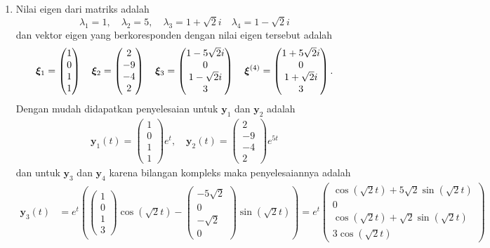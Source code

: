 \documentclass[a4paper]{article}
\theoremstyle{definisi}
\newcommand{\bfxi}{\boldsymbol{\xi}}
\numberwithin{equation}{section}
\begin{document}
\begin{enumerate}
    \item Nilai eigen dari matriks adalah
    \[\lambda_1 = 1, \quad \lambda_2 = 5, \quad \lambda_3 = 1 + \sqrt{2}i \quad \lambda_4 = 1 - \sqrt{2}i\]
    dan vektor eigen yang berkoresponden dengan nilai eigen tersebut adalah
    \[\bfxi_1 = \begin{pmatrix}1\\0\\1\\1\end{pmatrix} \quad \bfxi_2 = \begin{pmatrix}2\\-9\\-4\\2\end{pmatrix} \quad \bfxi_3 = \begin{pmatrix}1-5\sqrt{2}i\\0\\\-1-\sqrt{2}i\\3\end{pmatrix} \quad \bfxi^{(4)} = \begin{pmatrix}1+5\sqrt{2}i\\0\\\-1+\sqrt{2}i\\3\end{pmatrix}.\]
    Dengan mudah didapatkan penyelesaian untuk $\mathbf{y}_1$ dan $\mathbf{y}_2$ adalah
    \begin{align*}
      \mathbf{y}_1(t) = \begin{pmatrix}1\\0\\1\\1\end{pmatrix}e^t,\quad
      \mathbf{y}_2(t) = \begin{pmatrix}2\\-9\\-4\\2\end{pmatrix}e^{5t}
    \end{align*}
    dan untuk $\mathbf{y}_3$ dan $\mathbf{y}_4$ karena bilangan kompleks maka penyelesaiannya adalah
    \begin{align*}
      \mathbf{y}_3(t) &= e^t\left(\begin{pmatrix}1\\0\\1\\3\end{pmatrix}\cos(\sqrt{2}t) - \begin{pmatrix}-5\sqrt{2}\\0\\-\sqrt{2}\\0\end{pmatrix}\sin(\sqrt{2}t)\right)= e^t\begin{pmatrix}\cos(\sqrt{2}t)+5\sqrt{2}\sin(\sqrt{2}t)\\0\\\cos(\sqrt{2}t)+\sqrt{2}\sin(\sqrt{2}t)\\3\cos(\sqrt{2}t)\end{pmatrix}\\

\end{align*}
\end{enumerate}
\end{document}
